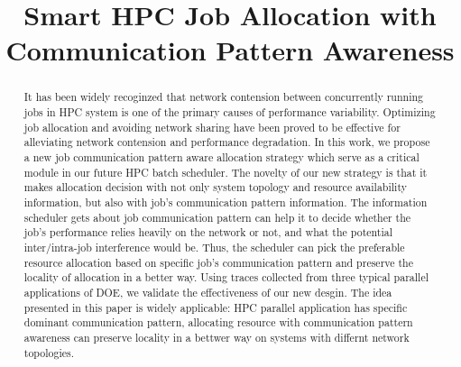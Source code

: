 \documentclass[conference]{IEEEtran}
\begin{document}
%
\title{Smart HPC Job Allocation with Communication Pattern Awareness}
\author{



}

\maketitle

\begin{abstract} 

It has been widely recoginzed that network contension between concurrently running jobs in HPC system is one of the primary causes of performance variability. Optimizing job allocation and avoiding network sharing have been proved to be effective for alleviating network contension and performance degradation. In this work, we propose a new job communication pattern aware allocation strategy which serve as a critical module in our future HPC batch scheduler. The novelty of our new strategy is that it makes allocation decision with not only system topology and resource availability information, but also with job's communication pattern information. The information scheduler gets about job communication pattern can help it to decide whether the job’s performance relies heavily on the network or not, and what the potential inter/intra-job interference would be. Thus, the scheduler can pick the preferable resource allocation based on specific job's communication pattern and preserve the locality of allocation in a better way. Using traces collected from three typical parallel applications of DOE, we validate the effectiveness of our new desgin. The idea presented in this paper is widely applicable: HPC parallel application has specific dominant communication pattern, allocating resource with communication pattern awareness can preserve locality in a bettwer way on systems with differnt network topologies.

\end{abstract}
\end{document}
